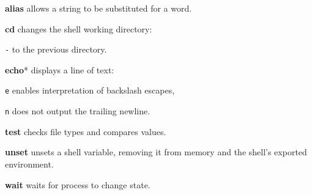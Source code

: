 \begin{enumx}
	\item [\cmd] \textbf{alias} allows a string to be substituted for a word.
	\item [\cmd] \textbf{cd} changes the shell working directory:
	\item [\texttt{-}] to the previous directory.
	\item [\cmd] \textbf{echo}* displays a line of text:
	\item [\texttt{e}] enables interpretation of backslash escapes,
	\item [\texttt{n}] does not output the trailing newline.
	\item [\cmd] \textbf{test} checks file types and compares values.
	\item [\cmd] \textbf{unset} unsets a shell variable, removing it from memory and the shell's exported environment.
	\item [\cmd] \textbf{wait} waits for process to change state.
\end{enumx}
